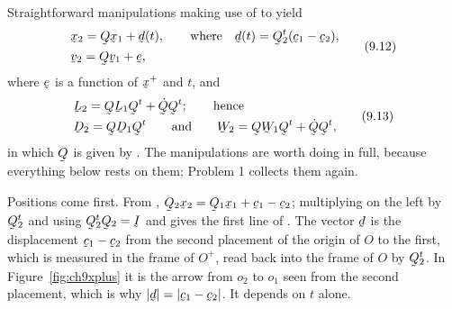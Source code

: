 Straightforward manipulations making use of  to 
yield
\begin{equation}
\begin{aligned}
   &\bx_{2}=\bQ\bx_{1}+\bd(t),\qquad
    \text{where}\quad \bd(t)=\bQ_{2}^{t}(\bc_{1}-\bc_{2}),\\
   &\bv_{2}=\bQ\bv_{1}+\be,
\end{aligned}
   \tag{9.12}\label{eq:9.12}
\end{equation}
where $\be$ is a function of $\bx^{+}$ and $t$, and
\begin{equation}
\begin{aligned}
   &\bL_{2}=\bQ\bL_{1}\bQ^{t}+\dot\bQ\bQ^{t};\qquad\text{hence}\\
   &\bD_{2}=\bQ\bD_{1}\bQ^{t}\qquad\text{and}\qquad
    \bW_{2}=\bQ\bW_{1}\bQ^{t}+\dot\bQ\bQ^{t},
\end{aligned}
   \tag{9.13}\label{eq:9.13}
\end{equation}
in which $\bQ$ is given by . The manipulations are worth
doing in full, because everything below rests on them; Problem 1
collects them again.

Positions come first. From ,
$\bQ_{2}\bx_{2}=\bQ_{1}\bx_{1}+\bc_{1}-\bc_{2}$; multiplying on the left
by $\bQ_{2}^{t}$ and using $\bQ_{2}^{t}\bQ_{2}=\I$ and  gives
the first line of . The vector $\bd$ is the displacement
$\bc_{1}-\bc_{2}$ from the second placement of the origin of $O$ to the
first, which is measured in the frame of $O^{+}$, read back into the
frame of $O$ by $\bQ_{2}^{t}$. In Figure~\ref{fig:ch9xplus} it is the
arrow from $o_{2}$ to $o_{1}$ seen from the second placement, which is
why $|\bd|=|\bc_{1}-\bc_{2}|$. It depends on $t$ alone.

